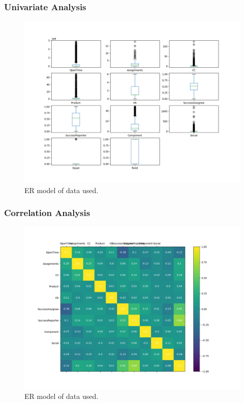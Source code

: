 \documentclass[xcolor=sgvnames,serifs,notes,compress,professionalfont]{beamer}
\begin{document}
\begin{frame}
\frametitle{Univariate Analysis}
\begin{figure}
	\includegraphics[height=0.75\textheight]{pictures/boxplots.png}    
	\caption{ER model of data used.}
\end{figure}

\end{frame}

\begin{frame}
\frametitle{Correlation Analysis}
\begin{figure}
	\includegraphics[height=0.75\textheight]{pictures/correlations.png}    
	\caption{ER model of data used.}
\end{figure}
\end{frame}
\end{document}
